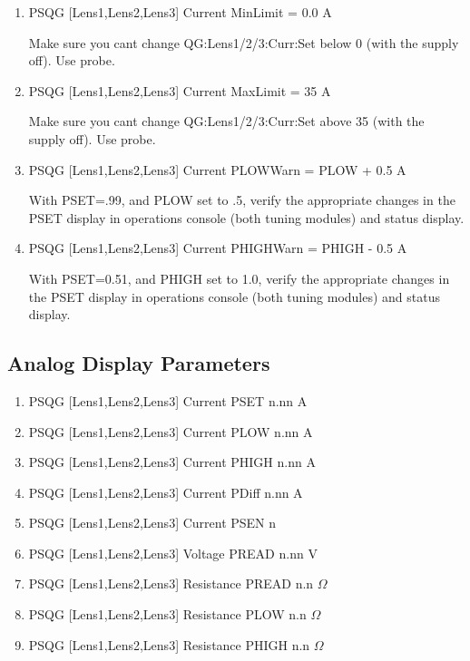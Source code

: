 \documentclass[11pt]{book}		%
\begin{document}
\begin{enumerate}
 \item PSQG [Lens1,Lens2,Lens3] Current MinLimit = 0.0 A

\color{red}
Make sure you cant change QG:Lens1/2/3:Curr:Set below 0 (with the supply off). Use probe.
\color{black}

 \item PSQG [Lens1,Lens2,Lens3] Current MaxLimit = 35 A

\color{red}
Make sure you cant change QG:Lens1/2/3:Curr:Set above 35 (with the supply off). Use probe.
\color{black}

 \item PSQG [Lens1,Lens2,Lens3] Current PLOWWarn = PLOW + 0.5 A

\color{red}
With PSET=.99, and PLOW set to .5, verify the appropriate changes in the PSET display in operations console (both tuning modules) and status display.
\color{black}

 \item PSQG [Lens1,Lens2,Lens3] Current PHIGHWarn = PHIGH - 0.5 A

\color{red}
With PSET=0.51, and PHIGH set to 1.0, verify the appropriate changes in the PSET display in operations console (both tuning modules) and status display.
\color{black}

\end{enumerate}

\subsection{Analog Display Parameters} \label{sect:cyc-equip-ctl-beamline-quad1-analog-display}

\begin{enumerate}
 \item PSQG [Lens1,Lens2,Lens3] Current PSET  n.nn A
 \item PSQG [Lens1,Lens2,Lens3] Current PLOW  n.nn A
 \item PSQG [Lens1,Lens2,Lens3] Current PHIGH n.nn A
 \item PSQG [Lens1,Lens2,Lens3] Current PDiff n.nn A
 \item PSQG [Lens1,Lens2,Lens3] Current PSEN  n
 \item PSQG [Lens1,Lens2,Lens3] Voltage PREAD n.nn V
 \item PSQG [Lens1,Lens2,Lens3] Resistance PREAD n.n $\Omega$
 \item PSQG [Lens1,Lens2,Lens3] Resistance PLOW n.n $\Omega$
 \item PSQG [Lens1,Lens2,Lens3] Resistance PHIGH n.n $\Omega$
\end{enumerate}
\end{document}
